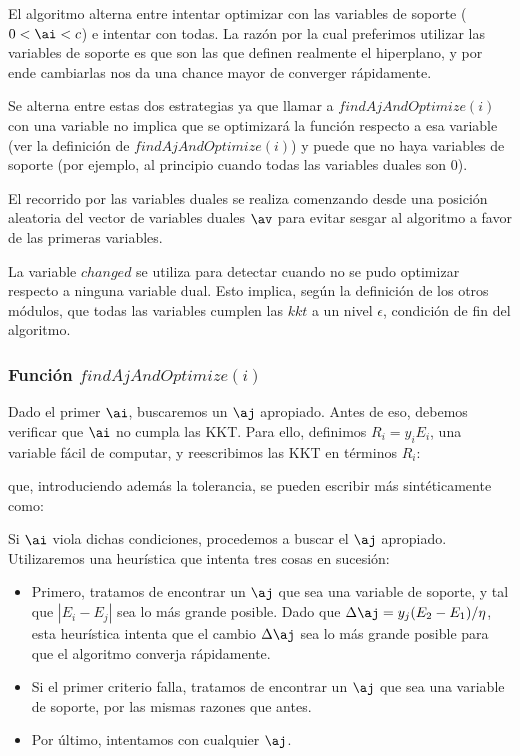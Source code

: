 El algoritmo alterna entre intentar optimizar con las variables de soporte ($0<\ai<c$) e intentar con todas. La razón por la cual preferimos utilizar las variables de soporte es que son las que definen realmente el hiperplano, y por ende cambiarlas nos da una chance mayor de converger rápidamente. 

Se alterna entre estas dos estrategias ya que llamar a $findAjAndOptimize(i)$ con una variable no implica que se optimizará la función respecto a esa variable (ver la definición de $findAjAndOptimize(i)$) y puede que no haya variables de soporte (por ejemplo, al principio cuando todas las variables duales son $0$).

El recorrido por las variables duales se realiza comenzando desde una posición aleatoria del vector de variables duales $\av$ para evitar sesgar al algoritmo a favor de las primeras variables.

La variable $changed$ se utiliza para detectar cuando no se pudo optimizar respecto a ninguna variable dual. Esto implica, según la definición de los otros módulos, que todas las variables cumplen las $kkt$ a un nivel $\epsilon$, condición de fin del algoritmo. 

\subsubsection{Función $findAjAndOptimize(i)$}

Dado el primer $\ai$, buscaremos un $\aj$ apropiado. Antes de eso, debemos verificar que $\ai$ no cumpla las KKT. Para ello, definimos $R_i=y_i E_i$, una variable fácil de computar, y reescribimos las KKT en términos $R_i$:


que, introduciendo además la tolerancia, se pueden escribir más sintéticamente como:




Si $\ai$ viola dichas condiciones, procedemos a buscar el $\aj$ apropiado. Utilizaremos una heurística que intenta tres cosas en sucesión:
\begin{itemize}
\item Primero, tratamos de encontrar un $\aj$ que sea una variable de soporte, y tal que $|E_i-E_j|$ sea lo más grande posible. Dado que $\Delta \aj = y_j (E_2-E_1) / \eta$, esta heurística intenta que el cambio $\Delta \aj$ sea lo más grande posible para que el algoritmo converja rápidamente.
\item Si el primer criterio falla, tratamos de encontrar un $\aj$ que sea una variable de soporte, por las mismas razones que antes.
\item Por último, intentamos con cualquier $\aj$.
\end{itemize}

